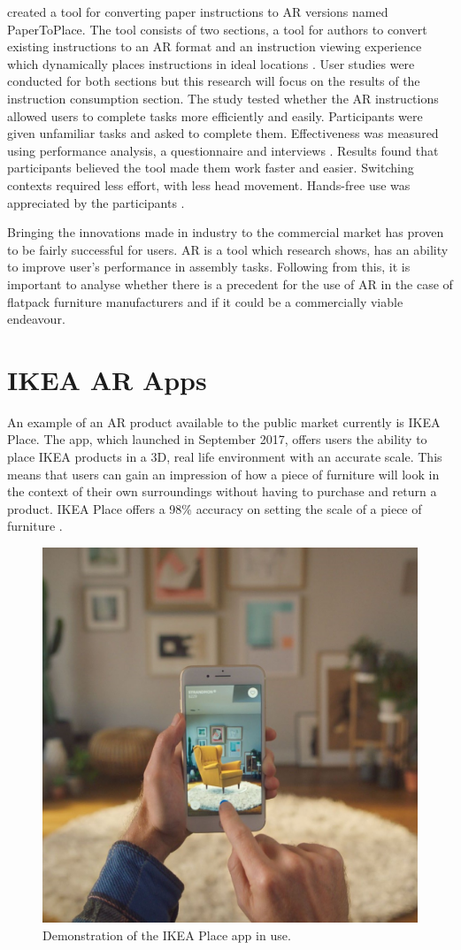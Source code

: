 \documentclass{l4proj}
\begin{document}
\citet{chen_papertoplace_2023} created a tool for converting paper instructions to AR versions named PaperToPlace. The tool consists of two sections, a tool for authors to convert existing instructions to an AR format and an instruction viewing experience which dynamically places instructions in ideal locations \citep{chen_papertoplace_2023}. User studies were conducted for both sections but this research will focus on the results of the instruction consumption section. The study tested whether the AR instructions allowed users to complete tasks more efficiently and easily. Participants were given unfamiliar tasks and asked to complete them. Effectiveness was measured using performance analysis, a questionnaire and interviews \citep{chen_papertoplace_2023}. Results found that participants believed the tool made them work faster and easier. Switching contexts required less effort, with less head movement. Hands-free use was appreciated by the participants \citep{chen_papertoplace_2023}.

Bringing the innovations made in industry to the commercial market has proven to be fairly successful for users. AR is a tool which research shows, has an ability to improve user's performance in assembly tasks. Following from this, it is important to analyse whether there is a precedent for the use of AR in the case of flatpack furniture manufacturers and if it could be a commercially viable endeavour. 

\section{IKEA AR Apps}

An example of an AR product available to the public market currently is IKEA Place. The app, which launched in September 2017, offers users the ability to place IKEA products in a 3D, real life environment with an accurate scale. This means that users can gain an impression of how a piece of furniture will look in the context of their own surroundings without having to purchase and return a product. IKEA Place offers a 98\% accuracy on setting the scale of a piece of furniture \citep{ikea_launch_2017}.

\begin{figure}[hbt!]
    \centering
    \includegraphics[width=0.5\linewidth]{dissertation//images/IKEAPlace.jpg}
    \caption{Demonstration of the IKEA Place app in use. \citep{ikea_launch_2017}}
    \label{fig:ikeaPlace}
\end{figure}
\end{document}

